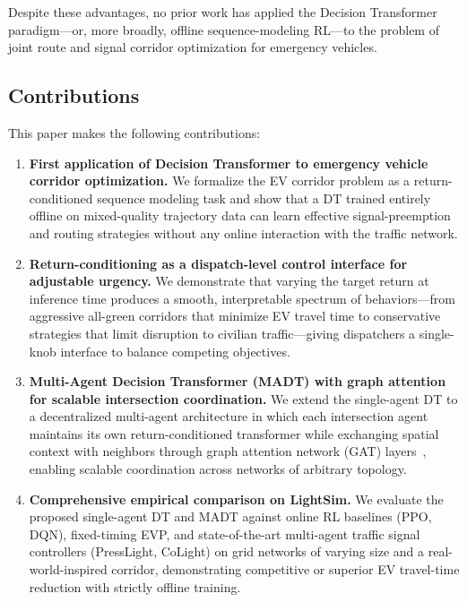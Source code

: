 \documentclass[journal]{IEEEtran}
\begin{document}
Despite these advantages, no prior work has applied the Decision
Transformer paradigm---or, more broadly, offline sequence-modeling
RL---to the problem of joint route and signal corridor optimization
for emergency vehicles.

\subsection*{Contributions}

This paper makes the following contributions:
\begin{enumerate}
  \item \textbf{First application of Decision Transformer to emergency
    vehicle corridor optimization.}  We formalize the EV corridor
    problem as a return-conditioned sequence modeling task and show
    that a DT trained entirely offline on mixed-quality trajectory data
    can learn effective signal-preemption and routing strategies
    without any online interaction with the traffic network.

  \item \textbf{Return-conditioning as a dispatch-level control
    interface for adjustable urgency.}  We demonstrate that varying
    the target return at inference time produces a smooth, interpretable
    spectrum of behaviors---from aggressive all-green corridors that
    minimize EV travel time to conservative strategies that limit
    disruption to civilian traffic---giving dispatchers a single-knob
    interface to balance competing objectives.

  \item \textbf{Multi-Agent Decision Transformer (MADT) with graph
    attention for scalable intersection coordination.}  We extend the
    single-agent DT to a decentralized multi-agent architecture in
    which each intersection agent maintains its own return-conditioned
    transformer while exchanging spatial context with neighbors through
    graph attention network (GAT) layers~\cite{velickovic2018graph},
    enabling scalable coordination across networks of arbitrary
    topology.

  \item \textbf{Comprehensive empirical comparison on LightSim.}  We
    evaluate the proposed single-agent DT and MADT against online RL
    baselines (PPO, DQN), fixed-timing EVP, and state-of-the-art
    multi-agent traffic signal controllers (PressLight, CoLight) on
    grid networks of varying size and a real-world-inspired corridor,
    demonstrating competitive or superior EV travel-time reduction with
    strictly offline training.
\end{enumerate}
\end{document}
